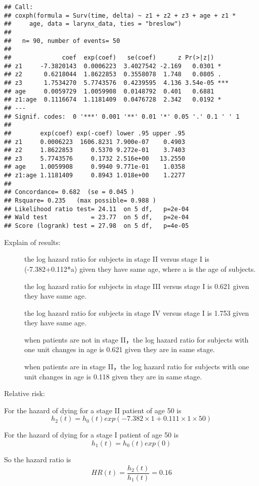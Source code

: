 \documentclass[]{article}
\begin{document}
\begin{verbatim}
## Call:
## coxph(formula = Surv(time, delta) ~ z1 + z2 + z3 + age + z1 * 
##     age, data = larynx_data, ties = "breslow")
## 
##   n= 90, number of events= 50 
## 
##              coef  exp(coef)   se(coef)      z Pr(>|z|)    
## z1     -7.3820143  0.0006223  3.4027542 -2.169   0.0301 *  
## z2      0.6218044  1.8622853  0.3558078  1.748   0.0805 .  
## z3      1.7534270  5.7743576  0.4239595  4.136 3.54e-05 ***
## age     0.0059729  1.0059908  0.0148792  0.401   0.6881    
## z1:age  0.1116674  1.1181409  0.0476728  2.342   0.0192 *  
## ---
## Signif. codes:  0 '***' 0.001 '**' 0.01 '*' 0.05 '.' 0.1 ' ' 1
## 
##        exp(coef) exp(-coef) lower .95 upper .95
## z1     0.0006223  1606.8231 7.900e-07    0.4903
## z2     1.8622853     0.5370 9.272e-01    3.7403
## z3     5.7743576     0.1732 2.516e+00   13.2550
## age    1.0059908     0.9940 9.771e-01    1.0358
## z1:age 1.1181409     0.8943 1.018e+00    1.2277
## 
## Concordance= 0.682  (se = 0.045 )
## Rsquare= 0.235   (max possible= 0.988 )
## Likelihood ratio test= 24.11  on 5 df,   p=2e-04
## Wald test            = 23.77  on 5 df,   p=2e-04
## Score (logrank) test = 27.98  on 5 df,   p=4e-05
\end{verbatim}

\begin{description}
\item[Explain of results:]
the log hazard ratio for subjects in stage II versus stage I is
(-7.382+0.112*a) given they have same age, where a is the age of
subjects.

the log hazard ratio for subjects in stage III versus stage I is 0.621
given they have same age.

the log hazard ratio for subjects in stage IV versus stage I is 1.753
given they have same age.

when patients are not in stage II，the log hazard ratio for subjects
with one unit changes in age is 0.621 given they are in same stage.

when patients are in stage II，the log hazard ratio for subjects with
one unit changes in age is 0.118 given they are in same stage.
\end{description}

Relative risk:

For the hazard of dying for a stage II patient of age 50 is
\[h_2(t) = h_0(t)exp(-7.382\times1 + 0.111\times1\times50)\]

For the hazard of dying for a stage I patient of age 50 is
\[h_1(t) = h_0(t)exp(0)\]

So the hazard ratio is \[HR(t) = \frac{h_2(t)}{h_1(t)} = 0.16\]
\end{document}
